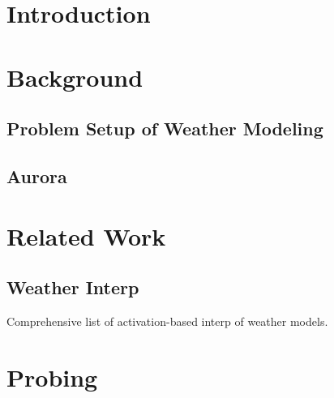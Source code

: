 \documentclass{article}
\theoremstyle{plain}
\theoremstyle{definition}
\begin{document}

\printAffiliationsAndNotice{}

\begin{abstract}
\end{abstract}

\section{Introduction} \label{sec:introduction}

\section{Background} \label{sec:background}

\subsection{Problem Setup of Weather Modeling}

\subsection{Aurora}

\section{Related Work}

\subsection{Weather Interp}

Comprehensive list of activation-based interp of weather models.

\section{Probing}
\end{document}
